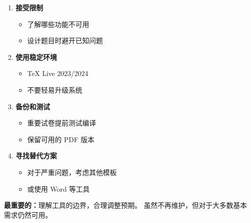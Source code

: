 \begin{enumerate}
  \item \textbf{接受限制}
    \begin{itemize}
      \item 了解哪些功能不可用
      \item 设计题目时避开已知问题
    \end{itemize}

  \item \textbf{使用稳定环境}
    \begin{itemize}
      \item \TeX{} Live 2023/2024
      \item 不要轻易升级系统
    \end{itemize}

  \item \textbf{备份和测试}
    \begin{itemize}
      \item 重要试卷提前测试编译
      \item 保留可用的 PDF 版本
    \end{itemize}

  \item \textbf{寻找替代方案}
    \begin{itemize}
      \item 对于严重问题，考虑其他模板
      \item 或使用 Word 等工具
    \end{itemize}
\end{enumerate}

\textbf{最重要的：}理解工具的边界，合理调整预期。 虽然不再维护，但对于大多数基本需求仍然可用。
